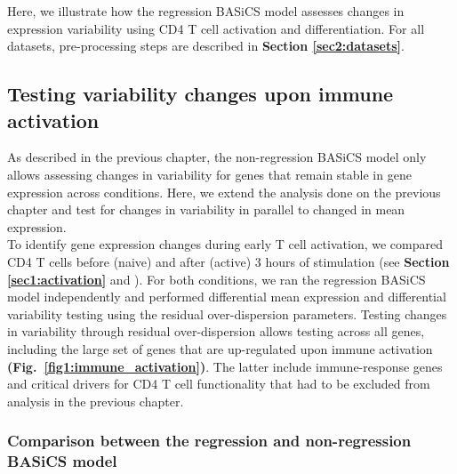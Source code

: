 Here, we illustrate how the regression BASiCS model assesses changes in expression variability using CD4\plus{} T cell activation and differentiation. For all datasets, pre-processing steps are described in \textbf{Section \ref{sec2:datasets}}. 

\subsection{Testing variability changes upon immune activation}

As described in the previous chapter, the non-regression BASiCS model only allows assessing changes in variability for genes that remain stable in gene expression across conditions. Here, we extend the analysis done on the previous chapter and test for changes in variability in parallel to changed in mean expression. \\

To identify gene expression changes during early T cell activation, we compared CD4\plus{} T cells before (naive) and after (active) 3 hours of stimulation (see \textbf{Section \ref{sec1:activation}} and \citep{Martinez-jimenez2017}). For both conditions, we ran the regression BASiCS model independently and performed differential mean expression and differential variability testing using the residual over-dispersion parameters. Testing changes in variability through residual over-dispersion allows testing across all genes, including the large set of genes that are up-regulated upon immune activation \textbf{(Fig.~\ref{fig1:immune_activation})}. The latter include immune-response genes and critical drivers for CD4\plus{} T cell functionality that had to be excluded from analysis in the previous chapter.

\subsubsection{Comparison between the regression and non-regression BASiCS model}

